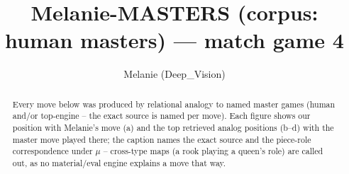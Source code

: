 \documentclass[11pt]{article}
\title{Melanie-MASTERS (corpus: human masters) — match game 4}
\author{Melanie (Deep\_Vision)}
\date{}
\begin{document}
\maketitle

\begin{abstract}Every move below was produced by relational analogy to named master games (human and/or top-engine -- the exact source is named per move). Each figure shows our position with Melanie's move (a) and the top retrieved analog positions (b--d) with the master move played there; the caption names the exact source and the piece-role correspondence under $\mu$ -- cross-type maps (a rook playing a queen's role) are called out, as no material/eval engine explains a move that way.\end{abstract}

\begin{figure}[p]\centering
\begin{subfigure}{0.46\textwidth}\centering
\resizebox{\linewidth}{!}{%
\newchessgame
\chessboard[
  setfen={r1bq1rk1/pppp1ppp/3n1b2/8/3P4/8/PPP2PPP/RNBQRBK1 b - - 2 10},
  showmover=false,
  pgfstyle=straightmove, color=movearrow, markmove={f8-e8}
]}
\caption{}
\end{subfigure}\hfill
\begin{subfigure}{0.46\textwidth}\centering
\resizebox{\linewidth}{!}{%
\newchessgame
\chessboard[
  setfen={rnbqrbk1/ppp2ppp/8/3p4/P7/3N1B2/1PPP1PPP/R1BQ1RK1 w - - 2 11},
  showmover=false,
  pgfstyle=straightmove, color=movearrow, markmove={f1-e1}
]}
\caption{}
\end{subfigure}
\\[4pt]
\begin{subfigure}{0.46\textwidth}\centering
\resizebox{\linewidth}{!}{%
\newchessgame
\chessboard[
  setfen={r1bqr1k1/pppp1ppp/3n1b2/8/3P1B2/8/PPP2PPP/RN1QRBK1 b - - 4 11},
  showmover=false,
  pgfstyle=straightmove, color=movearrow, markmove={e8-e1}
]}
\caption{}
\end{subfigure}\hfill
\begin{subfigure}{0.46\textwidth}\centering
\resizebox{\linewidth}{!}{%
\newchessgame
\chessboard[
  setfen={r1bqr1k1/pppp1ppp/3n1b2/8/3P1B2/8/PPP2PPP/RN1QRBK1 b - - 4 11},
  showmover=false,
  pgfstyle=straightmove, color=movearrow, markmove={e8-e1}
]}
\caption{}
\end{subfigure}

\end{figure}
\end{document}
